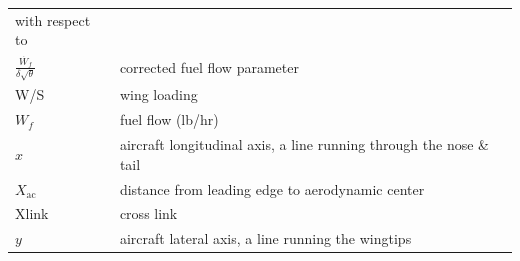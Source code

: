 \documentclass[
]{book}
\begin{document}
\begin{longtable}[]{@{}ll@{}}
\begin{minipage}[t]{0.47\columnwidth}
with respect to\strut
\end{minipage}\tabularnewline
\begin{minipage}[t]{0.47\columnwidth}\raggedright
\(\frac{\dot{W_f}}{\delta \sqrt{\theta}}\)\strut
\end{minipage} & \begin{minipage}[t]{0.47\columnwidth}\raggedright
corrected fuel flow parameter\strut
\end{minipage}\tabularnewline
\begin{minipage}[t]{0.47\columnwidth}\raggedright
W/S\strut
\end{minipage} & \begin{minipage}[t]{0.47\columnwidth}\raggedright
wing loading\strut
\end{minipage}\tabularnewline
\begin{minipage}[t]{0.47\columnwidth}\raggedright
\(W_f\)\strut
\end{minipage} & \begin{minipage}[t]{0.47\columnwidth}\raggedright
fuel flow (lb/hr)\strut
\end{minipage}\tabularnewline
\begin{minipage}[t]{0.47\columnwidth}\raggedright
\(x\)\strut
\end{minipage} & \begin{minipage}[t]{0.47\columnwidth}\raggedright
aircraft longitudinal axis, a line running through the nose \& tail\strut
\end{minipage}\tabularnewline
\begin{minipage}[t]{0.47\columnwidth}\raggedright
\(X_{\mathrm{ac}}\)\strut
\end{minipage} & \begin{minipage}[t]{0.47\columnwidth}\raggedright
distance from leading edge to aerodynamic center\strut
\end{minipage}\tabularnewline
\begin{minipage}[t]{0.47\columnwidth}\raggedright
Xlink\strut
\end{minipage} & \begin{minipage}[t]{0.47\columnwidth}\raggedright
cross link\strut
\end{minipage}\tabularnewline
\begin{minipage}[t]{0.47\columnwidth}\raggedright
\(y\)\strut
\end{minipage} & \begin{minipage}[t]{0.47\columnwidth}\raggedright
aircraft lateral axis, a line running the wingtips\strut
\end{minipage}\tabularnewline

\end{longtable}
\end{document}
